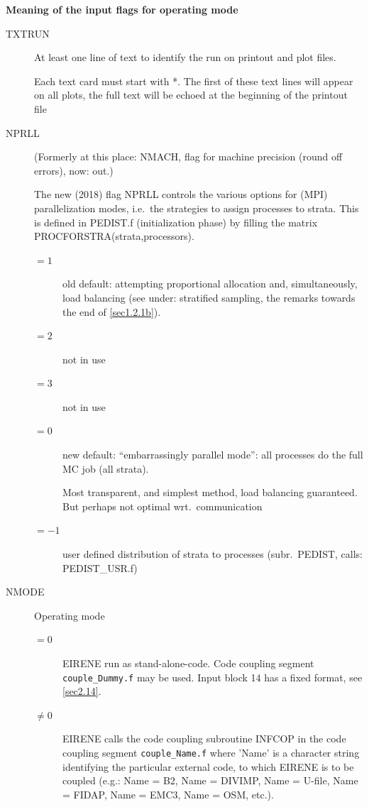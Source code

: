 \medskip

\textbf{Meaning of the input flags for operating mode} 

\medskip 

\begin{description}
  \item[TXTRUN] At least one line of text to identify the run
        on printout and plot files.

        Each text card must start with *.
        The first of these text lines will appear on all plots, the full text will be
        echoed at the beginning of the printout file
  \item[NPRLL] (Formerly at this
        place: NMACH, flag for machine precision (round off errors), now: out.)

        The new (2018) flag NPRLL controls the various options for (MPI)
        parallelization modes, i.e.\ the strategies to assign processes  to strata.
        This is defined in PEDIST.f (initialization phase) by filling the matrix
        PROCFORSTRA(strata,processors).
        \begin{description}
          \item[$= 1$] old default: attempting proportional allocation and,
                simultaneously, load balancing (see under: stratified sampling, the remarks
                towards the end of \cref{sec1.2.1b}).
          \item[$= 2$] not in use
          \item[$= 3$] not in use
          \item[$= 0$] new default:
                ``embarrassingly parallel mode'': all processes do the full MC job (all
                strata).

                Most transparent, and simplest method, load balancing guaranteed.
                But perhaps not optimal wrt.\ communication
          \item[$= -1$] user defined
                distribution of strata to processes (subr.\ PEDIST, calls: PEDIST\_USR.f)
        \end{description}

  \item[NMODE] Operating mode
        \begin{description}
          \item[$= 0$] EIRENE run as
                stand-alone-code.
                Code coupling segment \lstinline|couple_Dummy.f| may be used.
                Input block 14 has a fixed format, see \cref{sec2.14}.
          \item[$\ne 0$] EIRENE calls the code coupling subroutine INFCOP in the code
                coupling segment \lstinline|couple_Name.f| where 'Name' is a character string
                identifying the particular external code, to which EIRENE is to be coupled
                (e.g.: Name = B2, Name = DIVIMP, Name = U-file, Name = FIDAP, Name = EMC3, Name
                = OSM, etc.).


\end{description}
\end{description}
